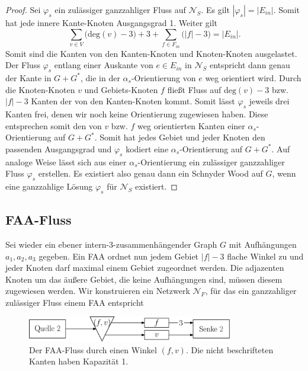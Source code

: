 \begin{proof}
Sei $\varphi_s$ ein zulässiger ganzzahliger Fluss auf $\mathcal{N}_S$. Es gilt $|\varphi_s| = |E_{in}|$. Somit hat jede innere Kante-Knoten Ausgangsgrad 1. Weiter gilt 
$$\sum_{v \in V} \Big(\text{deg}(v)-3\Big) + 3 + \sum_{f \in F_{in}} \Big(|f|-3\Big) = |E_{in}|.$$
Somit sind die Kanten von den Kanten-Knoten und Knoten-Knoten ausgelastet. Der Fluss $\varphi_s$ entlang einer Auskante von $e \in E_{in}$ in $\mathcal{N}_S$ entspricht dann genau der Kante in $G+G^*$, die in der $\alpha_{s}$-Orientierung von $e$ weg orientiert wird. Durch die Knoten-Knoten $v$ und Gebiets-Knoten $f$ fließt Fluss auf $\text{deg}(v)-3$ bzw. $|f|-3$ Kanten der von den Kanten-Knoten kommt. Somit lässt $\varphi_s$ jeweils drei Kanten frei, denen wir noch keine Orientierung zugewiesen haben. Diese entsprechen somit den von $v$ bzw. $f$ weg orientierten Kanten einer $\alpha_{s}$-Orientierung auf $G+G^*$. Somit hat jedes Gebiet und jeder Knoten den passenden Ausgangsgrad und $\varphi_s$ kodiert eine $\alpha_s$-Orientierung auf $G+G^*$. Auf analoge Weise lässt sich aus einer $\alpha_s$-Orientierung ein zulässiger ganzzahliger Fluss $\varphi_s$ erstellen. Es existiert also genau dann ein Schnyder Wood auf $G$, wenn eine ganzzahlige Lösung $\varphi_s$ für $\mathcal{N}_S$ existiert.
\end{proof}

\subsection{FAA-Fluss}\label{faa-flow}

Sei wieder ein ebener intern-3-zusammenhängender Graph $G$ mit Aufhängungen $a_1,a_2,a_3$ gegeben. Ein FAA ordnet nun jedem Gebiet $|f|-3$ flache Winkel zu und jeder Knoten darf maximal einem Gebiet zugeordnet werden. Die adjazenten Knoten um das äußere Gebiet, die keine Aufhängungen sind, müssen diesem zugewiesen werden. Wir konstruieren ein Netzwerk $\mathcal{N}_F$, für das ein ganzzahliger zulässiger Fluss einem FAA entspricht 

\begin{figure}
	\centering
  \includegraphics[width=0.8\textwidth]{faa_flow.png}
  \caption{Der FAA-Fluss durch einen Winkel $(f,v)$. Die nicht beschrifteten Kanten haben Kapazität 1.}
  \label{faa_flow}
\end{figure}

